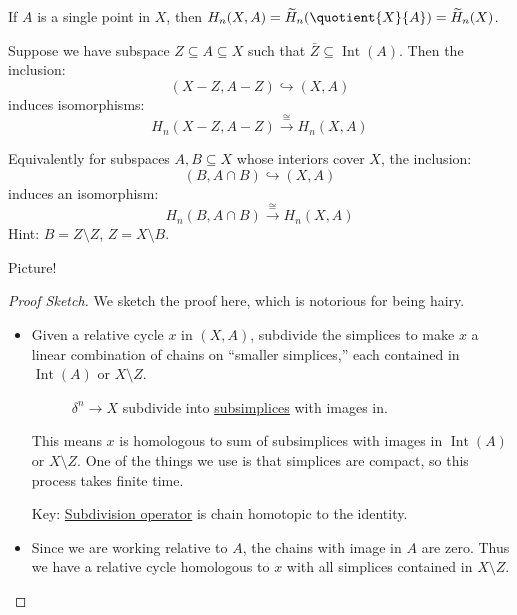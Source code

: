 \begin{exercise}
	If $A$ is a single point in $X$, then $H_n(X, A) = \widetilde{H}_n(\quotient{X}{A}) = \widetilde{H}_n(X)$.
\end{exercise}

\begin{theorem}[Excision]\label{thm:excision}
	Suppose we have subspace $Z \subseteq A \subseteq X$ such that $\bar{Z} \subseteq \operatorname{Int} (A)$. Then the inclusion:
	\[
		(X - Z, A - Z) \hookrightarrow (X, A)
	\]
	induces isomorphisms:
	\[
		H_n(X - Z, A - Z) \xrightarrow{\cong} H_n(X, A)
	\]
\end{theorem}

\begin{exercise}
	Equivalently for subspaces $A, B \subseteq X$ whose interiors cover $X$, the inclusion:
	\[
		(B, A \cap B) \hookrightarrow (X, A)
	\]
	induces an isomorphism:
	\[
		H_n(B, A \cap B) \xrightarrow{\cong} H_n(X, A)
	\]
	Hint: $B = Z \setminus Z$, $Z = X \setminus B$.
\end{exercise}
Picture!
\begin{figure}[H]
	\centering
	\label{fig:eg:excision-1}
\end{figure}

\begin{proof}[Proof Sketch]
	We sketch the proof here, which is notorious for being hairy.
	\begin{itemize}
		\item Given a relative cycle $x$ in $(X, A)$, subdivide the simplices to make $x$ a linear combination of chains on
		      ``smaller simplices,'' each contained in $\operatorname{Int}(A)$ or $X \setminus Z$.
		      \begin{figure}[H]
			      \centering
			      \caption{\(\delta ^n\to X\) subdivide into \hyperref[def:subsimplex]{subsimplices} with images in. }
			      \label{fig:pf:excision}
		      \end{figure}
		      This means $x$ is homologous to sum of subsimplices with images in $\operatorname{Int}(A)$ or $X \setminus Z$. One of the things we
		      use is that simplices are compact, so this process takes finite time.

		      Key: \underline{Subdivision operator} is chain homotopic to the identity.
		\item Since we are working relative to $A$, the chains with image in $A$ are zero. Thus we have a relative cycle homologous to $x$
		      with all simplices contained in $X \setminus Z$.
	\end{itemize}
\end{proof}

